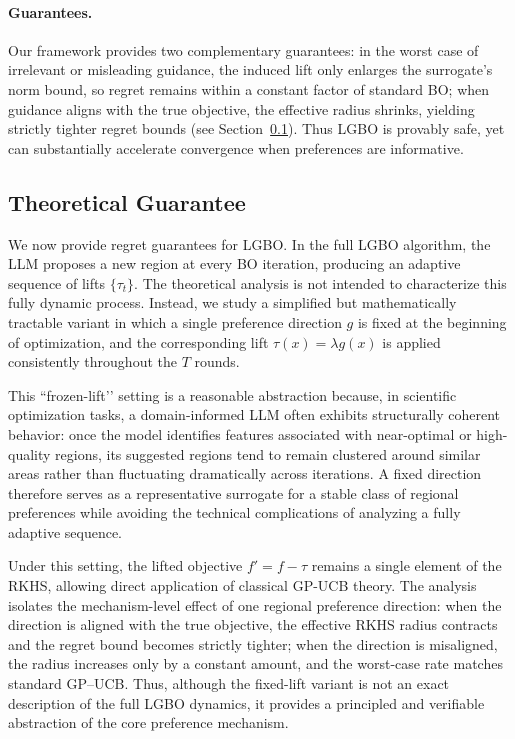 \documentclass{article} %
\begin{document}
\paragraph{Guarantees.}  
Our framework provides two complementary guarantees:  
in the worst case of irrelevant or misleading guidance, the induced lift only enlarges the surrogate’s norm bound, so regret remains within a constant factor of standard BO;  
when guidance aligns with the true objective, the effective radius shrinks, yielding strictly tighter regret bounds (see Section~\ref{sec:theory}).  
Thus LGBO is provably safe, yet can substantially accelerate convergence when preferences are informative.

\subsection{Theoretical Guarantee}
\label{sec:theory}

We now provide regret guarantees for LGBO.  In the full LGBO algorithm, the LLM proposes a new region at every BO iteration, producing an
adaptive sequence of lifts $\{\tau_t\}$.  
The theoretical analysis is not intended to characterize this fully dynamic process.  
Instead, we study a simplified but mathematically tractable variant in which a single
preference direction $g$ is fixed at the beginning of optimization, and the corresponding lift
$\tau(x)=\lambda g(x)$ is applied consistently throughout the $T$ rounds.

This “frozen-lift’’ setting is a reasonable abstraction because, in scientific optimization tasks,
a domain-informed LLM often exhibits structurally coherent behavior: once the model identifies
features associated with near-optimal or high-quality regions, its suggested regions tend to remain
clustered around similar areas rather than fluctuating dramatically across iterations.  
A fixed direction therefore serves as a representative surrogate for a stable class of regional
preferences while avoiding the technical complications of analyzing a fully adaptive sequence.

Under this setting, the lifted objective $f' = f - \tau$ remains a single element of the RKHS,
allowing direct application of classical GP-UCB theory.  
The analysis isolates the mechanism-level effect of one regional preference direction:
when the direction is aligned with the true objective, the effective RKHS radius contracts and the
regret bound becomes strictly tighter; when the direction is misaligned, the radius increases only
by a constant amount, and the worst-case rate matches standard GP–UCB.  
Thus, although the fixed-lift variant is not an exact description of the full LGBO dynamics, it
provides a principled and verifiable abstraction of the core preference mechanism.
\end{document}

